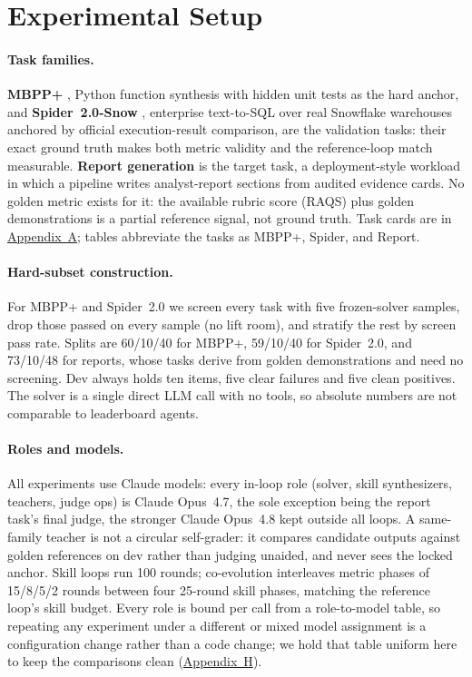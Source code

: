 \documentclass[letterpaper]{article} %
\begin{document}
\section{Experimental Setup}

\paragraph{Task families.}
\textbf{MBPP+} \citep{austin2021mbpp,liu2023evalplus}, Python function synthesis with hidden unit tests as the hard anchor, and \textbf{Spider~2.0-Snow} \citep{lei2025spider2}, enterprise text-to-SQL over real Snowflake warehouses anchored by official execution-result comparison, are the validation tasks: their exact ground truth makes both metric validity and the reference-loop match measurable. \textbf{Report generation} is the target task, a deployment-style workload in which a pipeline writes analyst-report sections from audited evidence cards. No golden metric exists for it: the available rubric score (RAQS) plus golden demonstrations is a partial reference signal, not ground truth. Task cards are in \hyperref[app:tasks]{Appendix~A}; tables abbreviate the tasks as MBPP+, Spider, and Report.

\paragraph{Hard-subset construction.}
For MBPP+ and Spider~2.0 we screen every task with five frozen-solver samples, drop those passed on every sample (no lift room), and stratify the rest by screen pass rate. Splits are 60/10/40 for MBPP+, 59/10/40 for Spider~2.0, and 73/10/48 for reports, whose tasks derive from golden demonstrations and need no screening. Dev always holds ten items, five clear failures and five clean positives. The solver is a single direct LLM call with no tools, so absolute numbers are not comparable to leaderboard agents.

\paragraph{Roles and models.}
All experiments use Claude models: every in-loop role (solver, skill synthesizers, teachers, judge ops) is Claude Opus~4.7, the sole exception being the report task's final judge, the stronger Claude Opus~4.8 kept outside all loops. A same-family teacher is not a circular self-grader: it compares candidate outputs against golden references on dev rather than judging unaided, and never sees the locked anchor. Skill loops run 100 rounds; co-evolution interleaves metric phases of 15/8/5/2 rounds between four 25-round skill phases, matching the reference loop's skill budget. Every role is bound per call from a role-to-model table, so repeating any experiment under a different or mixed model assignment is a configuration change rather than a code change; we hold that table uniform here to keep the comparisons clean (\hyperref[app:repro]{Appendix~H}).
\end{document}
